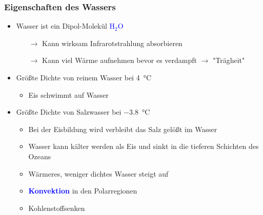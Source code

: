 \begin{frame}
	\frametitle{Eigenschaften des Wassers} %
	\begin{itemize}
		\item Wasser ist ein Dipol-Molekül \textcolor{blue}{H$_2$O}
		\begin{itemize}
			\item[$\rightarrow$] Kann wirksam Infrarotstrahlung absorbieren
			\item[$\rightarrow$] Kann viel Wärme aufnehmen bevor es verdampft $\rightarrow$ "Trägheit"
		\end{itemize}

		\item<2-> Größte Dichte von reinem Wasser bei \SI{4}{\degreeCelsius}
		\begin{itemize}
			\item<2->[$\rightarrow$] Eis schwimmt auf Wasser
		\end{itemize}
		\item<3->Größte Dichte von Salzwasser bei \SI{-3,8}{\degreeCelsius}
		\begin{itemize}
			\item<3-> [] Bei der Eisbildung wird verbleibt das Salz gelößt im Wasser
			\item<3-> [$\rightarrow$] Wasser kann kälter werden als Eis und sinkt in die tieferen Schichten des Ozeans
			\item<3-> [$\rightarrow$] Wärmeres, weniger dichtes Wasser steigt auf
			\item<3-> [] \textbf{\textcolor{blue}{Konvektion}} in den Polarregionen
			\item<3-> [$\rightarrow$] Kohlenstoffsenken
		\end{itemize}
	\end{itemize}



\end{frame}

